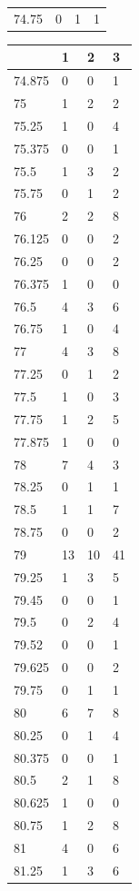 \begin{table}[H]
\begin{tabular}{llll}
		74.75  & 0  & 1  & 1  \\
	\end{tabular}
	\begin{tabular}{llll}
		& 1  & 2  & 3  \\
		\hline
		74.875 & 0  & 0  & 1  \\
		75     & 1  & 2  & 2  \\
		75.25  & 1  & 0  & 4  \\
		75.375 & 0  & 0  & 1  \\
		75.5   & 1  & 3  & 2  \\
		75.75  & 0  & 1  & 2  \\
		76     & 2  & 2  & 8  \\
		76.125 & 0  & 0  & 2  \\
		76.25  & 0  & 0  & 2  \\
		76.375 & 1  & 0  & 0  \\
		76.5   & 4  & 3  & 6  \\
		76.75  & 1  & 0  & 4  \\
		77     & 4  & 3  & 8  \\
		77.25  & 0  & 1  & 2  \\
		77.5   & 1  & 0  & 3  \\
		77.75  & 1  & 2  & 5  \\
		77.875 & 1  & 0  & 0  \\
		78     & 7  & 4  & 3  \\
		78.25  & 0  & 1  & 1  \\
		78.5   & 1  & 1  & 7  \\
		78.75  & 0  & 0  & 2  \\
		79     & 13 & 10 & 41 \\
		79.25  & 1  & 3  & 5  \\
		79.45  & 0  & 0  & 1  \\
		79.5   & 0  & 2  & 4  \\
		79.52  & 0  & 0  & 1  \\
		79.625 & 0  & 0  & 2  \\
		79.75  & 0  & 1  & 1  \\
		80     & 6  & 7  & 8  \\
		80.25  & 0  & 1  & 4  \\
		80.375 & 0  & 0  & 1  \\
		80.5   & 2  & 1  & 8  \\
		80.625 & 1  & 0  & 0  \\
		80.75  & 1  & 2  & 8  \\
		81     & 4  & 0  & 6  \\
		81.25  & 1  & 3  & 6  \\

\end{tabular}
\end{table}
